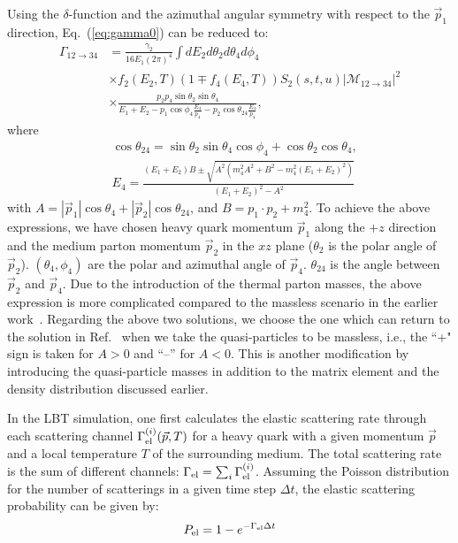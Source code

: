 \documentclass[aps,superscriptaddress,prc,twocolumn,nofootinbib]{revtex4}
\begin{document}
Using the $\delta$-function and the azimuthal angular symmetry with respect to the $\vec{p}_1$ direction, Eq.~(\ref{eq:gamma0}) can be reduced to:
\begin{align}
\Gamma_{12\to 34} &=\frac{\gamma_2}{16 E_1 (2 \pi)^4}\int dE_2 d\theta_2 d\theta_4 d\phi_4 \nonumber\\
 &\times f_2(E_2,T)(1\mp f_4(E_4,T))S_2(s,t,u) \big| \mathcal{M_\mathrm{12\rightarrow34}} \big|^2
 \nonumber\\
 &\times \frac{p_2 p_4 \sin \theta_2 \sin \theta_4}{E_1+E_2-p_1 \cos \phi_4 \frac{E_4}{p_4}-p_2 \cos\theta_{24} \frac{E_4}{p_4}},
 \label{eq:gamma1}
\end{align}
where
\begin{align}
& \cos\theta_{24} = \sin \theta_2 \sin \theta_4 \cos \phi_4+ \cos \theta_2 \cos \theta_4,
\\
& E_4  = \frac{(E_1 + E_2)B \pm \sqrt{A^2 (m_4^2 A^2 + B^2 - m_4^2(E_1 + E_2)^2)}}{(E_1 + E_2)^2 - A^2}
\end{align}
with $A = |\vec{p}_1|\cos \theta_4 + |\vec{p}_2|\cos \theta_{24}$, and $B = p_1 \cdot p_2 + m_4^2$. To achieve the above expressions, we have chosen heavy quark momentum $\vec{p}_1$ along the $+z$ direction and the medium parton momentum $\vec{p}_2$ in the $xz$ plane ($\theta_2$ is the polar angle of $\vec{p}_2$). $(\theta_4, \phi_4)$ are the polar and azimuthal angle of $\vec{p}_4$. $\theta_{24}$ is the angle between $\vec{p}_2$ and $\vec{p}_4$. Due to the introduction of the thermal parton masses, the above expression is more complicated compared to the massless scenario in the earlier work~\cite{Cao:2016gvr}. Regarding the above two solutions, we choose the one which can return to the solution in Ref.~\cite{Cao:2016gvr} when we take the quasi-particles to be massless, i.e., the ``+" sign is taken for $A > 0$ and ``--” for $A < 0$. This is another modification by introducing the quasi-particle masses in addition to the matrix element and the density distribution discussed earlier.


In the LBT simulation, one first calculates the elastic scattering rate through each scattering channel $\Gamma_{\rm el}^{(i)}(\vec{p}, T)$ for a heavy quark with a given momentum $\vec{p}$ and a local temperature $T$ of the surrounding medium. The total scattering rate is the sum of different channels: $\Gamma_{\rm el} = \sum_{i} \Gamma_{\rm el}^{(i)}$.
Assuming the Poisson distribution for the number of scatterings in a given time step $\Delta t$, the elastic scattering probability can be given by:
\begin{align}
	P_{\rm el} = 1 - e^{-\Gamma_{\rm el} \Delta t}
\end{align}
\end{document}
